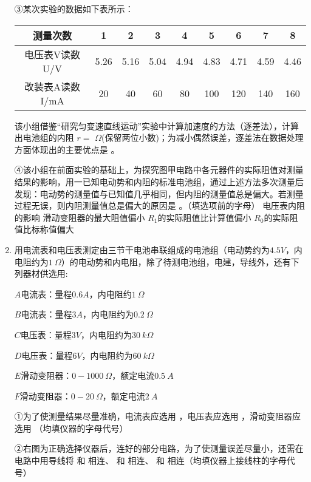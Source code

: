 \begin{enumerate}[leftmargin=0em]
③某次实验的数据如下表所示：

\begin{table}[h!]
\centering 
\begin{tabular}{|c|c|c|c|c|c|c|c|c|}
\hline 
测量次数 & 1 & 2 & 3 & 4 & 5 & 6 & 7 & 8
 \\
\hline
电压表V读数U/V & 5.26 & 5.16 & 5.04 & 4.94 & 4.83 & 4.71 & 4.59 & 4.46
 \\
\hline
改装表A读数I/mA & 20 & 40 & 60 & 80 & 100 & 120 & 140 & 160\\ 
\hline 
\end{tabular}
\end{table} 

该小组借鉴“研究匀变速直线运动”实验中计算加速度的方法（逐差法），计算出电池组的内阻 
$ r= $  
$ \Omega $(保留两位小数)；为减小偶然误差，逐差法在数据处理方面体现出的主要优点是  
。


④该小组在前面实验的基础上，为探究图甲电路中各元器件的实际阻值对测量结果的影响，用一已知电动势和内阻的标准电池组，通过上述方法多次测量后发现：电动势的测量值与已知值几乎相同，但内阻的测量值总是偏大。若测量过程无误，则内阻测量值总是偏大的原因是  
。（填选项前的字母）
\fourchoices
{电压表内阻的影响 }
{滑动变阻器的最大阻值偏小}
{$ R_{1} $的实际阻值比计算值偏小}
{$ R_{0} $的实际阻值比标称值偏大}



\newpage
\item 
{}
用电流表和电压表测定由三节干电池串联组成的电池组（电动势约为$ 4.5V $，内电阻约为$ 1 \ \Omega $）的电动势和内电阻，除了待测电池组，电建，导线外，还有下列器材供选用:

$ A $电流表：量程$ 0.6A $，内电阻约$ 1 \ \Omega $

$ B $电流表：量程$ 3A $，内电阻约为$ 0.2 \ \Omega $

$ C $电压表：量程$ 3V $，内电阻约为$ 30 \ k\Omega $

$ D $电压表：量程$ 6V $，内电阻约为$ 60 \ k\Omega $

$ E $滑动变阻器：$ 0-1000 \ \Omega $，额定电流$ 0.5\ A $

$ F $滑动变阻器：$ 0-20 \ \Omega $，额定电流$ 2\ A $

①为了使测量结果尽量准确，电流表应选用  
，电压表应选用  
，滑动变阻器应选用  
（均填仪器的字母代号）

②右图为正确选择仪器后，连好的部分电路，为了使测量误差尽量小，还需在电路中用导线将  
和  
相连、  
和  
相连、  
和  
相连（均填仪器上接线柱的字母代号）
\begin{figure}[h!]
\centering

\end{figure}


\end{enumerate}
